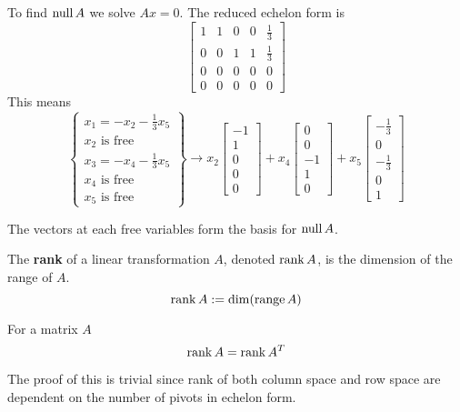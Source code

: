 To find $\operatorname{null} A$ we solve $Ax = 0$. The reduced echelon form is 
$$\begin{bmatrix}
1 & 1 & 0 & 0 & \frac{1}{3} \\
0 & 0 & 1 & 1 & \frac{1}{3} \\
0 & 0 & 0 & 0 & 0 \\
0 & 0 & 0 & 0 & 0
\end{bmatrix}$$
This means 
$$ \left\{ \begin{matrix}
x_{1} = -x_{2} - \frac{1}{3} x_{5} \\
x_{2} \text{ is free} \\
x_{3} = -x_{4} - \frac{1}{3} x_{5} \\
x_{4} \text{ is free} \\
x_{5} \text{ is free}
\end{matrix} \right\} \longrightarrow x_{2} \begin{bmatrix}
-1 \\
1 \\ 
0 \\
0 \\
0
\end{bmatrix} + x_{4} \begin{bmatrix}
0 \\ 
0 \\
-1 \\
1 \\
0
\end{bmatrix} + x_{5} \begin{bmatrix}
-\frac{1}{3} \\
0 \\
-\frac{1}{3} \\
0 \\
1
\end{bmatrix}$$

The vectors at each free variables form the basis for $\operatorname{null} A$. 

\begin{definition}
The \textbf{rank} of a linear transformation $A$, denoted $\operatorname{rank} A$, is the dimension of the range of $A$. 
$$\operatorname{rank} A := \operatorname{dim}(\operatorname{range} A)$$
\end{definition}

\begin{theorem}
For a matrix $A$ 
$$\operatorname{rank} A = \operatorname{rank} A^{T}$$

The proof of this is trivial since rank of both column space and row space are dependent on the number of pivots in echelon form. 
\end{theorem}

